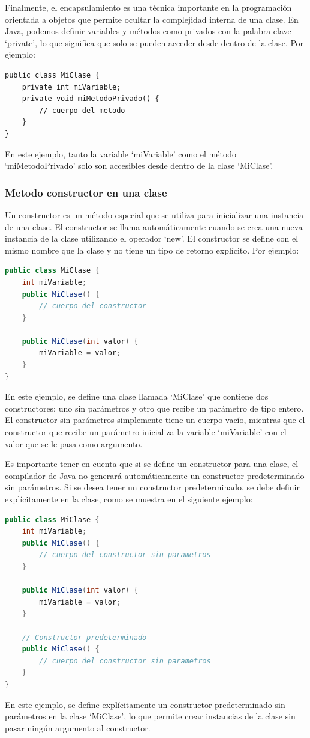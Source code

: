 \documentclass[executivepaper]{article}
\begin{document}
Finalmente, el encapsulamiento es una técnica importante en la programación orientada a objetos que permite ocultar la complejidad interna de una clase. En Java, podemos definir variables y métodos como privados con la palabra clave \enquote*{private}, lo que significa que solo se pueden acceder desde dentro de la clase. Por ejemplo:
\begin{lstlisting}
public class MiClase {
    private int miVariable;
    private void miMetodoPrivado() {
        // cuerpo del metodo
    }
}
\end{lstlisting}
En este ejemplo, tanto la variable \enquote*{miVariable} como el método \enquote*{miMetodoPrivado} solo son accesibles desde dentro de la clase \enquote*{MiClase}.

\subsubsection{Metodo constructor en una clase}
Un constructor es un método especial que se utiliza para inicializar una instancia de una clase. El constructor se llama automáticamente cuando se crea una nueva instancia de la clase utilizando el operador \enquote*{new}. El constructor se define con el mismo nombre que la clase y no tiene un tipo de retorno explícito. Por ejemplo:
\begin{lstlisting}[language=Java]
public class MiClase {
    int miVariable;
    public MiClase() {
        // cuerpo del constructor
    }
    
    public MiClase(int valor) {
        miVariable = valor;
    }
}
\end{lstlisting}
En este ejemplo, se define una clase llamada \enquote*{MiClase} que contiene dos constructores: uno sin parámetros y otro que recibe un parámetro de tipo entero. El constructor sin parámetros simplemente tiene un cuerpo vacío, mientras que el constructor que recibe un parámetro inicializa la variable \enquote*{miVariable} con el valor que se le pasa como argumento.

Es importante tener en cuenta que si se define un constructor para una clase, el compilador de Java no generará automáticamente un constructor predeterminado sin parámetros. Si se desea tener un constructor predeterminado, se debe definir explícitamente en la clase, como se muestra en el siguiente ejemplo:
\begin{lstlisting}[language=Java]
public class MiClase {
    int miVariable;
    public MiClase() {
        // cuerpo del constructor sin parametros
    }
    
    public MiClase(int valor) {
        miVariable = valor;
    }
    
    // Constructor predeterminado
    public MiClase() {
        // cuerpo del constructor sin parametros
    }
}
\end{lstlisting}
En este ejemplo, se define explícitamente un constructor predeterminado sin parámetros en la clase \enquote*{MiClase}, lo que permite crear instancias de la clase sin pasar ningún argumento al constructor.
\end{document}
